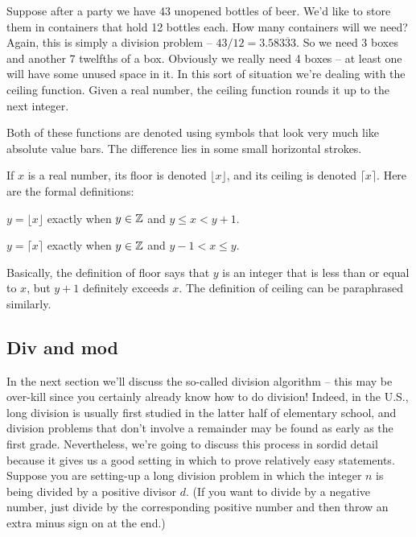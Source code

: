Suppose after a party we have 43 unopened bottles of beer.  We'd like
to store them in containers that hold 12 bottles each.  How many 
containers will we need?  Again, this is simply a division problem --
$43/12 = 3.58\overline{333}$.  So we need 3 boxes and another 
7 twelfths of a box.  Obviously we really need 4 boxes -- at least one
will have some unused space in it.  In this sort of situation
we're dealing with the ceiling function.  
Given a real number, the ceiling function rounds it up to the 
next integer.

Both of these functions are denoted using symbols that look very
much like absolute value bars.  The difference lies in some 
small horizontal strokes.

If $x$ is a real number, its floor is denoted $\lfloor x \rfloor$,
and its ceiling is denoted $\lceil x \rceil$.  Here are the 
formal definitions:

\begin{defi}
$y = \lfloor x \rfloor$ exactly when $y \in {\mathbb Z}$ and 
$y \leq x < y+1$.
\end{defi}

\begin{defi}
$y = \lceil x \rceil$ exactly when $y \in {\mathbb Z}$ and 
$y-1 < x \leq y$.
\end{defi}

Basically, the definition of floor says that $y$ is an integer
that is less than or equal to $x$, but $y+1$ definitely exceeds $x$.
The definition of ceiling can be paraphrased similarly.


\subsection{Div and mod}
\label{div/mod}

In the next section we'll discuss the so-called division algorithm --
this may be over-kill since you certainly already know how to do
division!  Indeed, in the U.S., long division is usually first studied
in the latter half of elementary school, and division problems that
don't involve a remainder may be found as early as the first grade.
Nevertheless, we're going to discuss this process in sordid detail
because it gives us a good setting in which to prove relatively easy
statements.  Suppose you are setting-up a long division problem in
which the integer $n$ is being divided by a positive divisor $d$.
(If you want to divide by a negative number, just divide by the
corresponding positive number and then throw an extra minus sign 
on at the end.)

